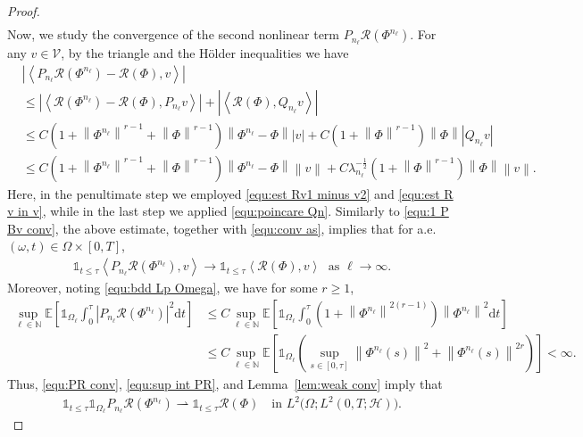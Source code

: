 \documentclass[11pt, reqno]{amsart}
\theoremstyle{definition}
\numberwithin{equation}{section}
\newcommand{\bb}{\mathbb}
\newcommand{\dt}{\mathrm{d}t}
\newcommand{\norm}[1]{\left\|{#1}\right\|}
\newcommand{\inpro}[2]{\left\langle#1,#2\right\rangle}
\newcommand{\abs}[1]{\left|{#1}\right|}
\newcommand{\one}{\mathds{1}}
\begin{document}
\begin{proof}
\begin{align}
\end{align}
Now, we study the convergence of the second nonlinear term $P_{n_\ell} \mathcal{R}(\Phi^{n_\ell})$. For any $v\in \mathcal{V}$, by the triangle and the H\"older inequalities we have
\begin{align*}
	&\abs{\inpro{P_{n_\ell} \mathcal{R}(\Phi^{n_\ell})- \mathcal{R}(\Phi)}{v}}
	\\
	&\leq
	\abs{\inpro{\mathcal{R}(\Phi^{n_\ell})- \mathcal{R}(\Phi)}{P_{n_\ell} v}}
	+
	\abs{\inpro{\mathcal{R}(\Phi)}{Q_{n_\ell} v}}
	\\
	&\leq
	C\left(1+\norm{\Phi^{n_\ell}}^{r-1} + \norm{\Phi}^{r-1}\right) \norm{\Phi^{n_\ell}-\Phi} \abs{v}
	+
	C \left(1+\norm{\Phi}^{r-1}\right) \norm{\Phi} \abs{Q_{n_\ell} v}
	\\
	&\leq
	C\left(1+\norm{\Phi^{n_\ell}}^{r-1} + \norm{\Phi}^{r-1}\right) \norm{\Phi^{n_\ell}-\Phi} \norm{v}
	+
	C\lambda_{n_\ell}^{-\frac12} \left(1+\norm{\Phi}^{r-1}\right) \norm{\Phi} \norm{v}.
\end{align*}
Here, in the penultimate step we employed \eqref{equ:est Rv1 minus v2} and \eqref{equ:est R v in v}, while in the last step we applied \eqref{equ:poincare Qn}. Similarly to \eqref{equ:1 P Bv conv}, the above estimate, together with \eqref{equ:conv as}, implies that for a.e. $(\omega,t)\in \Omega\times [0,T]$,
\begin{align}\label{equ:PR conv}
	\one_{t\leq \tau} \inpro{P_{n_\ell} \mathcal{R}(\Phi^{n_\ell})}{v} \to 
	\one_{t\leq \tau} \inpro{\mathcal{R}(\Phi)}{v}
	\; \text{ as $\ell\to\infty$}.
\end{align}
Moreover, noting \eqref{equ:bdd Lp Omega}, we have for some $r\geq 1$,
\begin{align}\label{equ:sup int PR}
	\sup_{\ell\in \bb{N}} \bb{E}\left[\one_{\Omega_{\ell}} \int_0^\tau \abs{P_{n_\ell}\mathcal{R}(\Phi^{n_\ell})}^2 \dt \right]
	&\leq
	C\sup_{\ell\in \bb{N}} \bb{E} \left[\one_{\Omega_\ell} \int_0^\tau \left(1+ \norm{\Phi^{n_\ell}}^{2(r-1)} \right) \norm{\Phi^{n_\ell}}^2 \dt \right]
	\nonumber\\
	&\leq
	C \sup_{\ell\in \bb{N}} \bb{E}\left[\one_{\Omega_\ell} \left( \sup_{s\in [0,\tau]} \norm{\Phi^{n_\ell}(s)}^2 + \norm{\Phi^{n_\ell}(s)}^{2r} \right) \right]
	<
	\infty.
\end{align}
Thus, \eqref{equ:PR conv}, \eqref{equ:sup int PR}, and Lemma~\ref{lem:weak conv} imply that
\begin{align}\label{equ:one PR conv}
	 \one_{t\leq \tau} \one_{\Omega_\ell} P_{n_\ell} \mathcal{R}(\Phi^{n_\ell}) \rightharpoonup \one_{t\leq \tau} \mathcal{R}(\Phi) \quad \text{in } L^2\big(\Omega;L^2(0,T;\mathcal{H})\big).

\end{align}
\end{proof}
\end{document}
